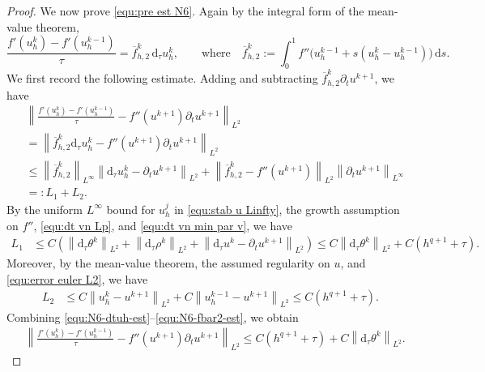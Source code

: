 \documentclass[10pt,a4paper]{amsart}
\newcommand{\ds}{\mathrm{d}s}
\newcommand{\dtt}{\mathrm{d}_\tau}
\newcommand{\norm}[2]{\left\|{#1}\right\|_{#2}}
\begin{document}
\begin{proof}
	We now prove \eqref{equ:pre est N6}. Again by the integral form of the mean-value theorem,
	\[
	\frac{f'(u_h^k)-f'(u_h^{k-1})}{\tau}
	=
	\overline f_{h,2}^k\, \dtt u_h^k, \qquad \text{where} \quad 
	\overline f_{h,2}^k
	:=
	\int_0^1
	f''\big(u_h^{k-1}+s(u_h^k-u_h^{k-1})\big)\,\ds .
	\]
	We first record the following estimate.
	Adding and subtracting
	$\overline f_{h,2}^k\partial_tu^{k+1}$, we have
	\begin{align*}
		&\norm{
			\frac{f'(u_h^k)-f'(u_h^{k-1})}{\tau}
			-
			f''(u^{k+1})\partial_tu^{k+1}
		}{L^2}
		\nonumber\\
		&=
		\norm{
			\overline f_{h,2}^k \dtt u_h^k
			-
			f''(u^{k+1})\partial_tu^{k+1}
		}{L^2}
		\nonumber\\
		&
		\leq
		\norm{\overline f_{h,2}^k}{L^\infty}
		\norm{\dtt u_h^k-\partial_tu^{k+1}}{L^2}
		+
		\norm{\overline f_{h,2}^k-f''(u^{k+1})}{L^2}
		\norm{\partial_tu^{k+1}}{L^\infty}
		\nonumber\\
		&=: L_1+L_2.
	\end{align*}
	By the uniform $L^\infty$ bound for $u_h^j$ in \eqref{equ:stab u Linfty}, the growth assumption on $f''$, \eqref{equ:dt vn Lp}, and \eqref{equ:dt vn min par v}, we have
	\begin{align}
		L_1
		&\leq
		C\left(\norm{\dtt\theta^k}{L^2}
		+
		\norm{\dtt\rho^k}{L^2}
		+
		\norm{\dtt u^k-\partial_tu^{k+1}}{L^2}\right)
		\leq
		C\norm{\dtt\theta^k}{L^2}
		+
		C(h^{q+1}+\tau).
		\label{equ:N6-dtuh-est}
	\end{align}
	Moreover, by the mean-value theorem, the assumed regularity on $u$, and \eqref{equ:error euler L2}, we have
	\begin{align}
		L_2
		&\leq
		C\norm{u_h^k-u^{k+1}}{L^2}
		+
		C\norm{u_h^{k-1}-u^{k+1}}{L^2}
		\leq
		C(h^{q+1}+\tau).
		\label{equ:N6-fbar2-est}
	\end{align}
	Combining \eqref{equ:N6-dtuh-est}--\eqref{equ:N6-fbar2-est}, we obtain
	\begin{align}
		\label{equ:diff-fprime-est}
		&\norm{
			\frac{f'(u_h^k)-f'(u_h^{k-1})}{\tau}
			-
			f''(u^{k+1})\partial_tu^{k+1}
		}{L^2}
		\leq
		C(h^{q+1}+\tau)
		+
		C\norm{\dtt\theta^k}{L^2}.
	\end{align}
	

\end{proof}
\end{document}
